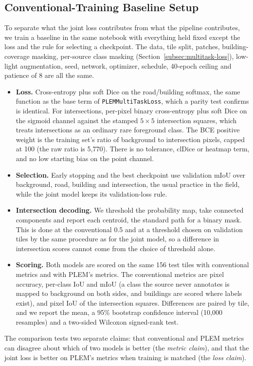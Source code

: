 \subsection{Conventional-Training Baseline Setup}
\label{subsec:baseline-setup}

To separate what the joint loss contributes from what the pipeline contributes, we train a
baseline in the same notebook with everything held fixed except the loss and the rule for selecting
a checkpoint. The data, tile split, patches, building-coverage masking, per-source class masking
(Section~\ref{subsec:multitask-loss}), low-light augmentation, seed, network, optimizer, schedule,
40-epoch ceiling and patience of 8 are all the same.

\begin{itemize}
  \item \textbf{Loss.} Cross-entropy plus soft Dice on the road/building softmax, the same function
    as the base term of \texttt{PLEMMultiTaskLoss}, which a parity test confirms is identical. For
    intersections, per-pixel binary cross-entropy plus soft Dice on the sigmoid channel against the
    stamped $5\times5$ intersection squares, which treats intersections as an ordinary rare
    foreground class. The BCE positive weight is the training set's ratio of background to
    intersection pixels, capped at 100 (the raw ratio is 5,770). There is no tolerance, clDice or
    heatmap term, and no low starting bias on the point channel.
  \item \textbf{Selection.} Early stopping and the best checkpoint use validation mIoU over
    background, road, building and intersection, the usual practice in the field, while the joint
    model keeps its validation-loss rule.
  \item \textbf{Intersection decoding.} We threshold the probability map, take connected
    components and report each centroid, the standard path for a binary mask. This is done at the
    conventional 0.5 and at a threshold chosen on validation tiles by the same procedure as for the
    joint model, so a difference in intersection scores cannot come from the choice of threshold
    alone.
  \item \textbf{Scoring.} Both models are scored on the same 156 test tiles with conventional
    metrics and with PLEM's metrics. The conventional metrics are pixel accuracy, per-class IoU
    and mIoU (a class the source never annotates is mapped to background on both sides, and
    buildings are scored where labels exist), and pixel IoU of the intersection squares.
    Differences are paired by tile, and we report the mean, a 95\% bootstrap confidence interval
    (10,000 resamples) and a two-sided Wilcoxon signed-rank test.
\end{itemize}

The comparison tests two separate claims: that conventional and PLEM metrics can disagree about
which of two models is better (the \emph{metric claim}), and that the joint loss is better on
PLEM's metrics when training is matched (the \emph{loss claim}).
